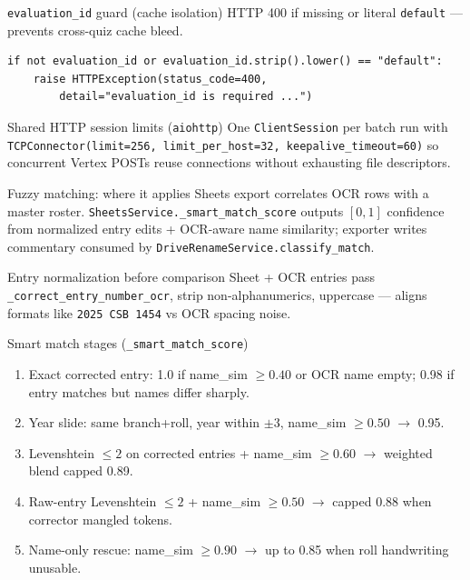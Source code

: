 \documentclass[aspectratio=169]{beamer}
\begin{document}
\begin{frame}[fragile]{\texttt{evaluation\_id} guard (cache isolation)}
  \footnotesize
  HTTP 400 if missing or literal \texttt{default} --- prevents cross-quiz cache bleed.
\begin{lstlisting}[style=py]
if not evaluation_id or evaluation_id.strip().lower() == "default":
    raise HTTPException(status_code=400,
        detail="evaluation_id is required ...")
\end{lstlisting}
\end{frame}

\begin{frame}{Shared HTTP session limits (\texttt{aiohttp})}
  \small
  One \texttt{ClientSession} per batch run with \texttt{TCPConnector(limit=256, limit\_per\_host=32, keepalive\_timeout=60)} so concurrent Vertex POSTs reuse connections without exhausting file descriptors.
\end{frame}

\begin{frame}{Fuzzy matching: where it applies}
  \small
  Sheets export correlates OCR rows with a master roster. \texttt{SheetsService.\_smart\_match\_score} outputs $[0,1]$ confidence from normalized entry edits + OCR-aware name similarity; exporter writes commentary consumed by \texttt{DriveRenameService.classify\_match}.
\end{frame}

\begin{frame}{Entry normalization before comparison}
  \small
  Sheet + OCR entries pass \texttt{\_correct\_entry\_number\_ocr}, strip non-alphanumerics, uppercase --- aligns formats like \texttt{2025 CSB 1454} vs OCR spacing noise.
\end{frame}

\begin{frame}{Smart match stages (\texttt{\_smart\_match\_score})}
  \tiny
  \begin{enumerate}\setlength\itemsep{0.12em}
    \item Exact corrected entry: 1.0 if name\_sim $\geq 0.40$ or OCR name empty; 0.98 if entry matches but names differ sharply.
    \item Year slide: same branch+roll, year within $\pm 3$, name\_sim $\geq 0.50$ $\rightarrow$ 0.95.
    \item Levenshtein $\leq 2$ on corrected entries + name\_sim $\geq 0.60$ $\rightarrow$ weighted blend capped 0.89.
    \item Raw-entry Levenshtein $\leq 2$ + name\_sim $\geq 0.50$ $\rightarrow$ capped 0.88 when corrector mangled tokens.
    \item Name-only rescue: name\_sim $\geq 0.90$ $\rightarrow$ up to 0.85 when roll handwriting unusable.
  \end{enumerate}
\end{frame}
\end{document}

